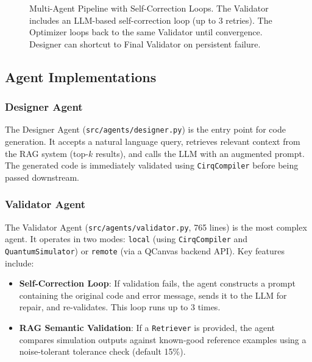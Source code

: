 \documentclass[runningheads]{llncs}
\begin{document}
\begin{figure}[H]
    \caption{Multi-Agent Pipeline with Self-Correction Loops. The Validator includes an LLM-based self-correction loop (up to 3 retries). The Optimizer loops back to the same Validator until convergence. Designer can shortcut to Final Validator on persistent failure.}
    \label{fig:arch}
\end{figure}

\subsection{Agent Implementations}
\subsubsection{Designer Agent}
The Designer Agent (\texttt{src/agents/designer.py}) is the entry point for code generation. It accepts a natural language query, retrieves relevant context from the RAG system (top-$k$ results), and calls the LLM with an augmented prompt. The generated code is immediately validated using \texttt{CirqCompiler} before being passed downstream.

\subsubsection{Validator Agent}
The Validator Agent (\texttt{src/agents/validator.py}, 765 lines) is the most complex agent. It operates in two modes: \texttt{local} (using \texttt{CirqCompiler} and \texttt{QuantumSimulator}) or \texttt{remote} (via a QCanvas backend API). Key features include:
\begin{itemize}
    \item \textbf{Self-Correction Loop}: If validation fails, the agent constructs a prompt containing the original code and error message, sends it to the LLM for repair, and re-validates. This loop runs up to 3 times.
    \item \textbf{RAG Semantic Validation}: If a \texttt{Retriever} is provided, the agent compares simulation outputs against known-good reference examples using a noise-tolerant tolerance check (default 15\%).
\end{itemize}
\end{document}
